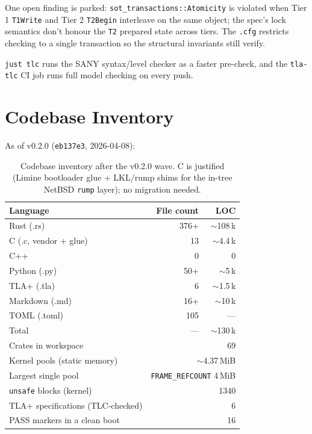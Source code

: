 \documentclass[11pt,a4paper]{article}
\begin{document}
One open finding is parked: \texttt{sot\_transactions::Atomicity} is
violated when Tier 1 \texttt{T1Write} and Tier 2 \texttt{T2Begin}
interleave on the same object; the spec's lock semantics don't honour
the \texttt{T2} prepared state across tiers. The \texttt{.cfg}
restricts checking to a single transaction so the structural
invariants still verify.

\texttt{just tlc} runs the SANY syntax/level checker as a faster
pre-check, and the \texttt{tla-tlc} CI job runs full model checking on
every push.

\section{Codebase Inventory}

As of v0.2.0 (\texttt{eb137e3}, 2026-04-08):

\begin{table}[h]
\centering
\small
\begin{tabular}{lrr}
\toprule
\textbf{Language} & \textbf{File count} & \textbf{LOC} \\
\midrule
Rust (.rs) & 376+ & $\sim$108\,k \\
C (.c, vendor + glue) & 13 & $\sim$4.4\,k \\
C++ & 0 & 0 \\
Python (.py) & 50+ & $\sim$5\,k \\
TLA+ (.tla) & 6 & $\sim$1.5\,k \\
Markdown (.md) & 16+ & $\sim$10\,k \\
TOML (.toml) & 105 & --- \\
Total & --- & $\sim$130\,k \\
\midrule
Crates in workspace & \multicolumn{2}{r}{69} \\
Kernel pools (static memory) & \multicolumn{2}{r}{$\sim$4.37\,MiB} \\
Largest single pool & \multicolumn{2}{r}{\texttt{FRAME\_REFCOUNT} 4\,MiB} \\
\texttt{unsafe} blocks (kernel) & \multicolumn{2}{r}{1340} \\
TLA+ specifications (TLC-checked) & \multicolumn{2}{r}{6} \\
PASS markers in a clean boot & \multicolumn{2}{r}{16} \\
\bottomrule
\end{tabular}
\caption{Codebase inventory after the v0.2.0 wave. C is justified
(Limine bootloader glue + LKL/rump shims for the in-tree NetBSD
\texttt{rump} layer); no migration needed.}
\end{table}
\end{document}
